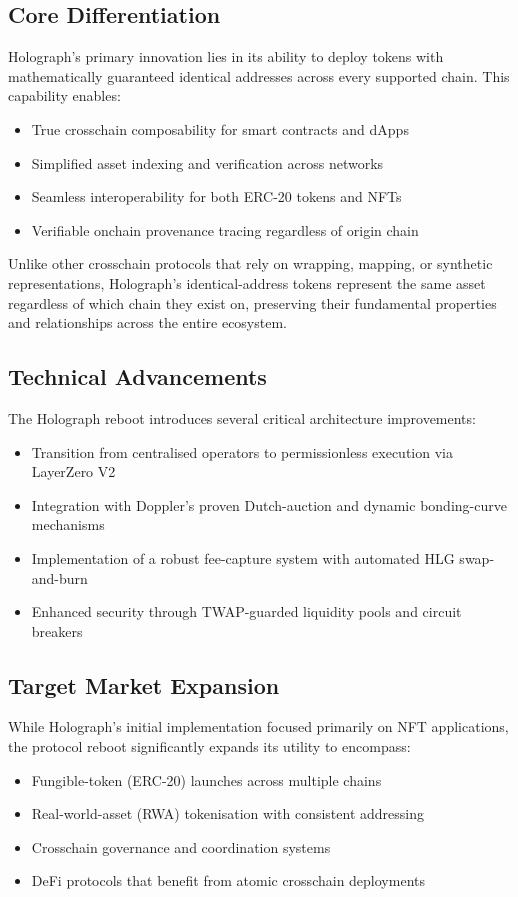 \documentclass[10pt,a4paper,twocolumn]{article}
\begin{document}
\subsection{Core Differentiation}
Holograph's primary innovation lies in its ability to deploy tokens with mathematically guaranteed identical addresses across every supported chain. This capability enables:
\begin{itemize}
  \item True crosschain composability for smart contracts and dApps
  \item Simplified asset indexing and verification across networks
  \item Seamless interoperability for both ERC-20 tokens and NFTs
  \item Verifiable onchain provenance tracing regardless of origin chain
\end{itemize}

Unlike other crosschain protocols that rely on wrapping, mapping, or synthetic representations, Holograph's identical-address tokens represent the same asset regardless of which chain they exist on, preserving their fundamental properties and relationships across the entire ecosystem.

\subsection{Technical Advancements}
The Holograph reboot introduces several critical architecture improvements:
\begin{itemize}
  \item Transition from centralised operators to permissionless execution via LayerZero V2
  \item Integration with Doppler's proven Dutch-auction and dynamic bonding-curve mechanisms
  \item Implementation of a robust fee-capture system with automated HLG swap-and-burn
  \item Enhanced security through TWAP-guarded liquidity pools and circuit breakers
\end{itemize}

\subsection{Target Market Expansion}
While Holograph's initial implementation focused primarily on NFT applications, the protocol reboot significantly expands its utility to encompass:
\begin{itemize}
  \item Fungible-token (ERC-20) launches across multiple chains
  \item Real-world-asset (RWA) tokenisation with consistent addressing
  \item Crosschain governance and coordination systems
  \item DeFi protocols that benefit from atomic crosschain deployments
\end{itemize}
\end{document}
